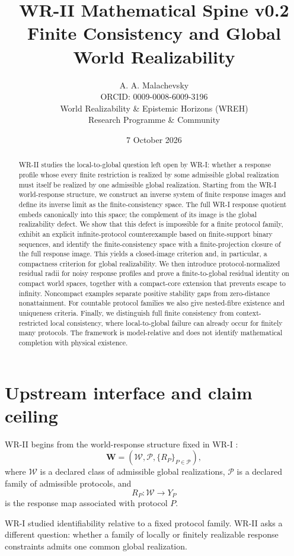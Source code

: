 \documentclass[11pt]{article}
\title{\textbf{WR-II Mathematical Spine v0.2}\\[4pt]
\large Finite Consistency and Global World Realizability}
\author{A. A. Malachevsky\\
ORCID: 0009-0008-6009-3196\\
World Realizability \& Epistemic Horizons (WREH)\\
Research Programme \& Community}
\date{7 October 2026}
\newcommand{\W}{\mathcal W}
\newcommand{\Pcal}{\mathcal P}
\begin{document}
\maketitle

\begin{abstract}
WR-II studies the local-to-global question left open by WR-I: whether a response
profile whose every finite restriction is realized by some admissible global
realization must itself be realized by one admissible global realization.
Starting from the WR-I world-response structure, we construct an inverse system
of finite response images and define its inverse limit as the finite-consistency
space. The full WR-I response quotient embeds canonically into this space; the
complement of its image is the global realizability defect. We show that this
defect is impossible for a finite protocol family, exhibit an explicit
infinite-protocol counterexample based on finite-support binary sequences, and
identify the finite-consistency space with a finite-projection closure of the
full response image. This yields a closed-image criterion and, in particular,
a compactness criterion for global realizability. We then introduce
protocol-normalized residual radii for noisy response profiles and prove a
finite-to-global residual identity on compact world spaces, together with a
compact-core extension that prevents escape to infinity. Noncompact examples
separate positive stability gaps from zero-distance nonattainment. For
countable protocol families we also give nested-fibre existence and uniqueness
criteria. Finally, we distinguish full finite consistency from
context-restricted local consistency, where local-to-global failure can already
occur for finitely many protocols. The framework is model-relative and does
not identify mathematical completion with physical existence.
\end{abstract}

\section{Upstream interface and claim ceiling}

WR-II begins from the world-response structure fixed in WR-I
\cite{MalachevskyWRI}:
\[
\mathbf W=(\W,\Pcal,\{R_P\}_{P\in\Pcal}),
\]
where $\W$ is a declared class of admissible global realizations, $\Pcal$ is a
declared family of admissible protocols, and
\[
R_P:\W\to Y_P
\]
is the response map associated with protocol $P$.

WR-I studied identifiability relative to a fixed protocol family. WR-II asks a
different question: whether a family of locally or finitely realizable response
constraints admits one common global realization.
\end{document}
